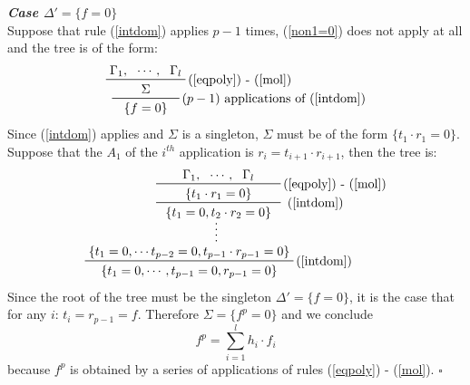 \documentclass[a4paper,12pt,oneside]{book}
\newcommand*{\QED}{\hfill\ensuremath{\square}}
\newcommand*{\QEDn}{\newline\hspace*{1cm}\QED} %
\begin{document}
\newpage

\textbf{\emph{Case $\Delta '=\{f=0\}$ }} \\
Suppose that rule (\ref{intdom}) applies $p-1$ times, (\ref{non1=0}) does not apply at all and the tree is of the form:
$$
\prftree[r]{$(p-1)$ applications of (\ref{intdom})}
{ \prftree[r]{(\ref{eqpoly}) - (\ref{mol})}
{ \Gamma_1, }{\cdots ,}{\Gamma_l}
{\hspace{7mm}\Sigma\hspace{7mm}	} 
}
{\{f=0\} }
$$
Since (\ref{intdom}) applies and $\Sigma$ is a singleton, $\Sigma$ must be of the form $ \{ t_1 \cdot r_1 =0 \}$. Suppose that the $A_1$ of the $i^{th}$ application is $r_i=t_{i+1}\cdot r_{i+1}$, then the tree is:
$$
\prfsummary{
\prftree[r]{ (\ref{intdom})}
{ \prftree[r]{(\ref{eqpoly}) - (\ref{mol})}
{ \Gamma_1, }{\cdots ,}{\Gamma_l}
{\hspace{7mm}\{t_1 \cdot r_1=0\}\hspace{7mm}	} 
}
{\{ t_1=0, t_2 \cdot r_2=0\} }
}
{\prftree[r]{(\ref{intdom})}
{\{ t_1=0,\cdots t_{p-2}=0, t_{p-1}\cdot r_{p-1}=0\}  }
{\{ t_1=0,\cdots ,t_{p-1}=0,r_{p-1}=0\}}
}
$$
Since the root of the tree must be the singleton $\Delta '=\{f=0\}$, it is the case that for any $i$: $t_i=r_{p-1}=f $.
Therefore $\Sigma= \{ f^p =0 \}$ and we conclude 
$$f^p = \sum_{i=1}^l h_i \cdot f_i $$
because  $f^p$ is obtained by a series of applications of rules (\ref{eqpoly}) - (\ref{mol}).
\QEDn
\end{document}
